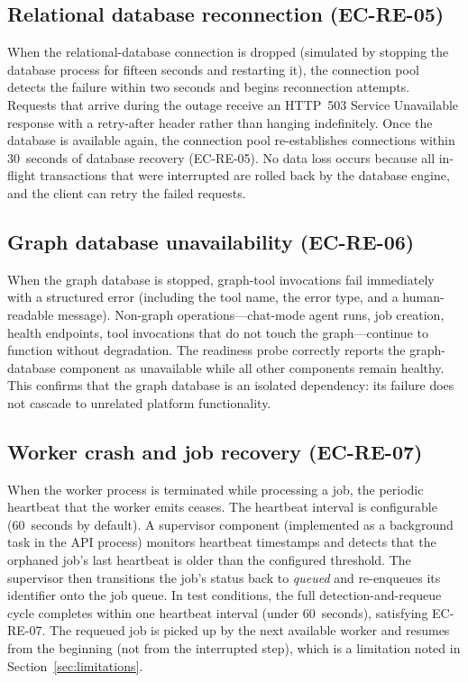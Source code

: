 \documentclass[a4paper]{sapthesis}
\begin{document}
\subsection{Relational database reconnection (EC-RE-05)}

When the relational-database connection is dropped (simulated by stopping
the database process for fifteen seconds and restarting it), the
connection pool detects the failure within two seconds and begins
reconnection attempts.  Requests that arrive during the outage receive
an HTTP~503 Service Unavailable response with a retry-after header
rather than hanging indefinitely.  Once the database is available again,
the connection pool re-establishes connections within 30~seconds of
database recovery (EC-RE-05).  No data loss occurs because all in-flight
transactions that were interrupted are rolled back by the database engine,
and the client can retry the failed requests.

\subsection{Graph database unavailability (EC-RE-06)}

When the graph database is stopped, graph-tool invocations fail
immediately with a structured error (including the tool name, the error
type, and a human-readable message).  Non-graph operations---chat-mode
agent runs, job creation, health endpoints, tool invocations that do not
touch the graph---continue to function without degradation.  The
readiness probe correctly reports the graph-database component as
unavailable while all other components remain healthy.  This confirms
that the graph database is an isolated dependency: its failure does not
cascade to unrelated platform functionality.

\subsection{Worker crash and job recovery (EC-RE-07)}

When the worker process is terminated while processing a job, the
periodic heartbeat that the worker emits ceases.  The heartbeat interval
is configurable (60~seconds by default).  A supervisor component
(implemented as a background task in the API process) monitors heartbeat
timestamps and detects that the orphaned job's last heartbeat is older
than the configured threshold.  The supervisor then transitions the
job's status back to \emph{queued} and re-enqueues its identifier onto
the job queue.  In test conditions, the full detection-and-requeue
cycle completes within one heartbeat interval (under 60~seconds),
satisfying EC-RE-07.  The requeued job is picked up by the next
available worker and resumes from the beginning (not from the
interrupted step), which is a limitation noted in
Section~\ref{sec:limitations}.
\end{document}
